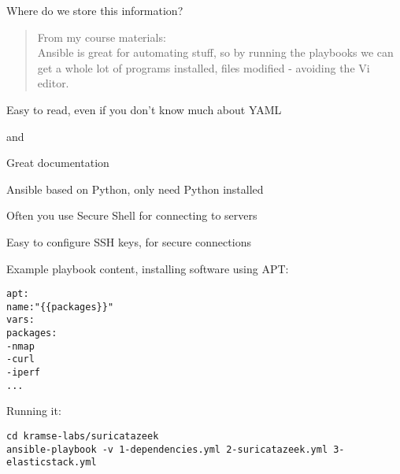 \documentclass[Screen16to9,17pt]{foils}
\begin{document}
\centerline{Where do we store this information?}





\begin{quote}
From my course materials:\\
Ansible is great for automating stuff, so by running the playbooks we can get a whole lot of programs installed, files modified - avoiding the Vi editor.
\end{quote}

\begin{list2}
\item Easy to read, even if you don't know much about YAML
\item {} and 
\item Great documentation 
\end{list2}




\begin{list2}
\item Ansible based on Python, only need Python installed\\
\item Often you use Secure Shell for connecting to servers\\
\item Easy to configure SSH keys, for secure connections
\end{list2}





Example playbook content, installing software using APT:
\begin{alltt}\small
apt:
    name: "\{\{ packages \}\}"
    vars:
      packages:
        - nmap
        - curl
        - iperf
        ...
\end{alltt}

Running it:
\begin{verbatim}
cd kramse-labs/suricatazeek
ansible-playbook -v 1-dependencies.yml 2-suricatazeek.yml 3-elasticstack.yml
\end{verbatim}
\end{document}
